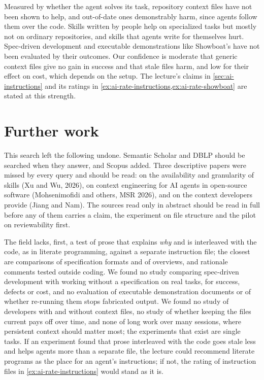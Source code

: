 Measured by whether the agent solves its task, repository context files have
not been shown to help, and out-of-date ones demonstrably harm, since agents
follow them over the code.
Skills written by people help on specialized tasks but mostly not on ordinary
repositories, and skills that agents write for themselves hurt.
Spec-driven development and executable demonstrations like Showboat's have not
been evaluated by their outcomes.
Our confidence is moderate that generic context files give no gain in success
and that stale files harm, and low for their effect on cost, which depends on
the setup.
The lecture's claims in \cref{sec:ai-instructions} and its ratings in
\cref{ex:ai-rate-instructions,ex:ai-rate-showboat} are stated at this strength.

\section{Further work}
\label{sec:ai-rq4-further}

This search left the following undone.
Semantic Scholar and DBLP should be searched when they answer, and Scopus
added.
Three descriptive papers were missed by every query and should be read: on the
availability and granularity of skills (Xu and Wu, 2026), on context
engineering for AI agents in open-source software (Mohsenimofidi and others,
MSR 2026), and on the context developers provide (Jiang and Nam).
The sources read only in abstract should be read in full before any of them
carries a claim, the experiment on file structure\autocite{%
mcmillan2026adherence} and the pilot on reviewability\autocite{%
schmalbach2026contracts} first.

The field lacks, first, a test of prose that explains \emph{why} and is
interleaved with the code, as in literate programming, against a separate
instruction file; the closest are comparisons of specification formats and of
overviews, and rationale comments tested outside
coding\autocite{canedo2026architecture,%
gloaguen2026agentsmd,chakrabarti2026growing}.
We found no study comparing spec-driven development with working without a
specification on real tasks, for success, defects or cost, and no evaluation of
executable demonstration documents or of whether re-running them stops
fabricated output.
We found no study of developers with and without context files, no study of
whether keeping the files current pays off over time, and none of long work
over many sessions, where persistent context should matter most; the
experiments that exist are single tasks.
If an experiment found that prose interleaved with the code goes stale less and
helps agents more than a separate file, the lecture could recommend literate
programs as the place for an agent's instructions; if not, the rating of
instruction files in \cref{ex:ai-rate-instructions} would stand as it is.

